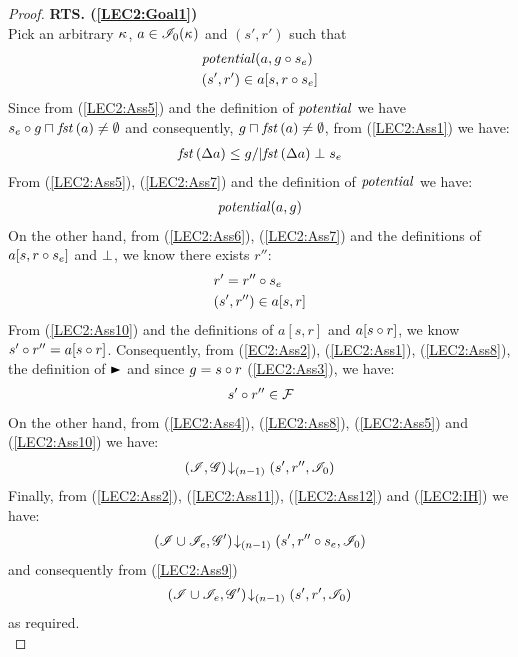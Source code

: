 \begin{lemma}
\begin{proof}
\noindent\textbf{RTS. (\ref{LEC2:Goal1})}\\
Pick an arbitrary $\kappa_{}$, $a \in \mathscr{I}_0(\kappa_{})$ and $(s', r')$ such that
%
\begin{align}
	& \mathit{potential}(a, g \circ s_e) \label{LEC2:Ass5}\\
	& (s', r') \in a[s, r \circ s_e] \label{LEC2:Ass6}
\end{align}
Since from (\ref{LEC2:Ass5}) and the definition of $\mathit{potential}$ we have $s_e \circ g \sqcap_{} \mathit{fst}\left(a\right) \not= \emptyset$ and consequently, $g \sqcap_{} \mathit{fst}\left(a\right) \not= \emptyset$, from (\ref{LEC2:Ass1}) we have:
%
\begin{align}
	\mathit{fst}\left(\Delta {a}\right) \leq g /| \mathit{fst}\left(\Delta {a}\right) \mathrel{\bot} s_e \label{LEC2:Ass7}
\end{align}
% 
From (\ref{LEC2:Ass5}), (\ref{LEC2:Ass7}) and the definition of $\mathit{potential}$ we have:
%
\begin{align}
	\mathit{potential}(a, g) \label{LEC2:Ass8}
\end{align}
%
On the other hand, from (\ref{LEC2:Ass6}), (\ref{LEC2:Ass7}) and the definitions of $a[s, r \circ s_e]$ and $\mathrel{\bot}$, we know there exists $r''$: 
%
\begin{align}
	& r' = r'' \circ s_e \label{LEC2:Ass9}\\
	& (s', r'') \in a[s, r]  \label{LEC2:Ass10}
\end{align}
%
From (\ref{LEC2:Ass10}) and the definitions of $a[s, r]$ and $a[s \circ r]$, we know $s' \circ r'' = a[s \circ r]$. Consequently, from (\ref{EC2:Ass2}), (\ref{LEC2:Ass1}), (\ref{LEC2:Ass8}), the definition of $\strictfences$ and since $g = s \circ r$ (\ref{LEC2:Ass3}), we have:
%
\begin{align}
	s' \circ r'' \in \mathcal{F}_{}  \label{LEC2:Ass11}
\end{align}
On the other hand, from (\ref{LEC2:Ass4}), (\ref{LEC2:Ass8}), (\ref{LEC2:Ass5}) and (\ref{LEC2:Ass10}) we have:
%
\begin{align}
	\left(\mathscr{I}, \mathscr{G}\right) \!\downarrow_{(n-1)} \left(s', r'', \mathscr{I}_0\right) \label{LEC2:Ass12}
\end{align}
%
Finally, from (\ref{LEC2:Ass2}), (\ref{LEC2:Ass11}), (\ref{LEC2:Ass12}) and (\ref{LEC2:IH}) we have:
%
\begin{align*}
	\left(\mathscr{I} \cup \mathscr{I}_{e}, \mathscr{G}'\right) \!\downarrow_{(n-1)} \left(s', r'' \circ s_e, \mathscr{I}_0\right)
\end{align*}
%
and consequently from (\ref{LEC2:Ass9})
%
\begin{align*}
	\left(\mathscr{I} \cup \mathscr{I}_{e}, \mathscr{G}'\right) \!\downarrow_{(n-1)} \left(s', r', \mathscr{I}_0\right)
\end{align*}
%
as required.\\
%
%
%



\end{proof}
\end{lemma}
